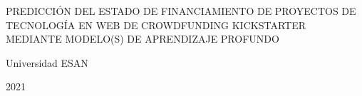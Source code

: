 \thispagestyle{plain}
\begin{center}
	{PREDICCIÓN DEL ESTADO DE FINANCIAMIENTO DE PROYECTOS DE TECNOLOGÍA EN WEB DE CROWDFUNDING KICKSTARTER MEDIANTE MODELO(S) DE APRENDIZAJE PROFUNDO}
\end{center}

\vspace{2.5cm}

\dotfill

\vspace{1.5cm}

\dotfill

\vspace{1.5cm}

\dotfill

\vspace{1.5cm}

\centerline{Universidad ESAN}
\centerline{2021}